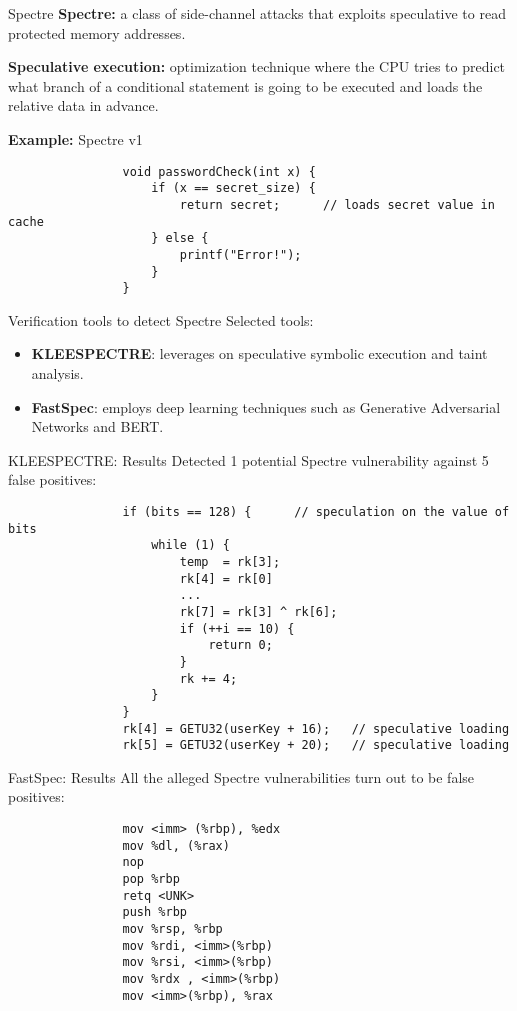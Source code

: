\documentclass[beamer={noamsthm,10pt},target=mst]{thud}[2014/03/11]
\begin{document}
		\begin{frame}[fragile]{Spectre}
			\textbf{Spectre:} a class of side-channel attacks that exploits speculative to read protected memory addresses.
			\vspace{0.5cm}
			
			\textbf{Speculative execution:} optimization technique where the CPU tries to predict what branch of a conditional statement is going to be executed and loads the relative data in advance.
			\vspace{0.5cm}
			
			\textbf{Example:} Spectre v1
			\begin{lstlisting}
				void passwordCheck(int x) {
					if (x == secret_size) {
						return secret;      // loads secret value in cache 
					} else {
						printf("Error!");
					}
				}
			\end{lstlisting}
		\end{frame}
		
		
		\begin{frame}{Verification tools to detect Spectre}
			Selected tools:
			
			\begin{itemize}
				\item \textbf{KLEESPECTRE}: leverages on speculative symbolic execution and taint analysis.
				\item \textbf{FastSpec}: employs deep learning techniques such as Generative Adversarial Networks and BERT.
			\end{itemize}
		\end{frame}
		
		
		\begin{frame}[fragile]{KLEESPECTRE: Results}
			Detected 1 potential Spectre vulnerability against 5 false positives:
			
			\begin{lstlisting}
				if (bits == 128) {      // speculation on the value of bits
					while (1) {
						temp  = rk[3];
						rk[4] = rk[0]
						...
						rk[7] = rk[3] ^ rk[6];
						if (++i == 10) {
							return 0;
						}
						rk += 4;
					}
				}
				rk[4] = GETU32(userKey + 16);   // speculative loading
				rk[5] = GETU32(userKey + 20);   // speculative loading
			\end{lstlisting}
			
		\end{frame}
		
		
		\begin{frame}[fragile]{FastSpec: Results}
			All the alleged Spectre vulnerabilities turn out to be false positives:
			\begin{lstlisting}
				mov <imm> (%rbp), %edx
				mov %dl, (%rax)
				nop
				pop %rbp
				retq <UNK>
				push %rbp
				mov %rsp, %rbp
				mov %rdi, <imm>(%rbp)
				mov %rsi, <imm>(%rbp)
				mov %rdx , <imm>(%rbp)
				mov <imm>(%rbp), %rax
			\end{lstlisting}
		\end{frame}
		
	
\end{document}
